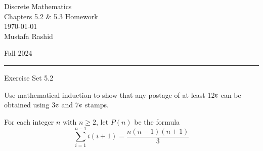 \documentclass[12pt,letterpaper, onecolumn]{exam}
\begin{document}
	
	\begingroup  
	\noindent\LARGE Discrete Mathematics\\
	\noindent\LARGE Chapters 5.2 \& 5.3 Homework\\
	\noindent\large \today\\
	\noindent\large Mustafa Rashid\par
	\noindent\large Fall 2024\par
	\endgroup
	\rule{\textwidth}{0.4pt}
	\pointsdroppedatright
	\printanswers
	\renewcommand{\solutiontitle}{\noindent\textbf{Ans:}\enspace}  
	
	\centering\large Exercise Set 5.2\\
	\begin{questions}
		\setcounter{question}{1} \question  Use mathematical induction to show that any postage of at least 12$\mbox{\textcentoldstyle}$ can be obtained using 3$\mbox{\textcentoldstyle}$   and 7$\mbox{\textcentoldstyle}$  stamps.
		
		\setcounter{question}{3}\question  For each integer $n$ with $n\geq2$, let $P(n)$ be the formula
		$$\sum_{i=1}^{n-1}i(i+1)=\frac{n(n-1)(n+1)}{3}$$
\end{questions}
\end{document}
